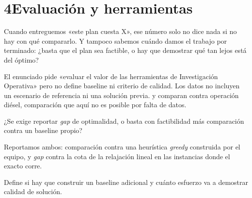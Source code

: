 \documentclass[11pt,a4paper,parskip=half]{scrartcl}
\begin{document}
\section*{4\quad Evaluación y herramientas}

\begin{campos}
\item[En simple] Cuando entreguemos «este plan cuesta X», ese número solo no dice nada si no hay con qué compararlo. Y tampoco sabemos cuándo damos el trabajo por terminado: ¿basta que el plan sea factible, o hay que demostrar qué tan lejos está del óptimo?
\item[Evidencia] El enunciado pide «evaluar el valor de las herramientas de Investigación Operativa» pero no define baseline ni criterio de calidad. Los datos no incluyen un escenario de referencia ni una solución previa. \citet{basso_disaggregatedenergy_2024} y \citet{oemick_economicsocialeval_2019} comparan contra operación diésel, comparación que aquí no es posible por falta de datos.
\item[Pregunta] ¿Se exige reportar \textit{gap} de optimalidad, o basta con factibilidad más comparación contra un baseline propio?
\item[Supuesto] Reportamos ambos: comparación contra una heurística \textit{greedy} construida por el equipo, y \textit{gap} contra la cota de la relajación lineal en las instancias donde el exacto corre.
\item[Impacto] Define si hay que construir un baseline adicional y cuánto esfuerzo va a demostrar calidad de solución.
\end{campos}
\end{document}
